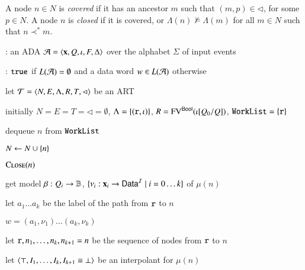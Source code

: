 \documentclass[10pt,conference,letterpaper,twocolumn]{IEEEtran}
\begin{document}
A node $n \in N$ is \emph{covered} if it has an ancestor $m$ such that
$(m,p) \in \lhd$, for some $p \in N$. A node $n$ is \emph{closed} if
it is covered, or $\Lambda(n) \not\models \Lambda(m)$ for all $m \in
N$ such that $n \prec^* m$.

\begin{algorithm}[t!]
{\scriptsize\begin{algorithmic}[0]
  : an ADA $\mathcal{A} = \left\langle \mathbf x,Q,\iota,F,\Delta \right\rangle$
  over the alphabet $\Sigma$ of input events

  : $\mathtt{true}$ if $L(\mathcal{A})=\emptyset$ and a data word $w
  \in L(\mathcal{A})$ otherwise
\end{algorithmic}}

{\scriptsize\begin{algorithmic}[1] 

  \State let $\mathcal{T} = \left\langle N,E,\Lambda,R,T,\lhd \right\rangle$ be an ART 

  \State initially $N = E = T = \lhd = \emptyset$, $\Lambda =
  \left\{ (\mathtt{r},\iota) \right\}$, $R = \mathrm{FV}^{\mathsf{Bool}}(\iota[Q_0/Q])$,
  $\mathtt{WorkList}=\left\{ \mathtt{r} \right\}$
  
  \While{$\worklist \neq \emptyset$}

  \State dequeue $n$ from $\mathtt{WorkList}$ 

  \State $N \leftarrow N \cup \left\{ n \right\}$

  \State $\Call{Close}{n}$
  \label{ln:close-worklist}


  \label{ln:impact-cex}


  \State get model $\beta : Q_i \rightarrow \mathbb{B}$, $\{\nu_i :
  \mathbf x_i \rightarrow \mathsf{Data}^{\mathcal{I}} \mid i=0\ldots k\}$ of $\mu(n)$

  \State let $a_1 \ldots a_k$ be the label of the path from
  $\mathtt{r}$ to $n$

   $w = (a_1,\nu_1) \ldots (a_k,\nu_k)$

  \Else {}

  \State let $\mathtt{r},n_1,\ldots,n_k,n_{k+1}=n$ be the sequence of nodes from $\mathtt{r}$ to $n$
  \label{ln:refine-begin}

  \State let $\left\langle \top,I_1,\ldots,I_k,I_{k+1}\equiv\bot \right\rangle$ be an interpolant for $\mu(n)$


\end{algorithmic}}
\end{algorithm}
\end{document}
